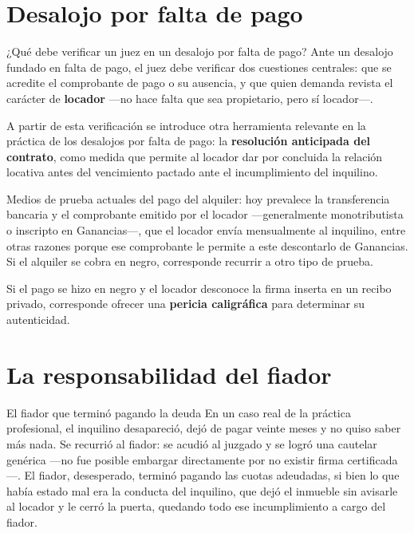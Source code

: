 \documentclass[12pt,oneside]{book}
\begin{document}
\section{Desalojo por falta de pago}

\begin{exercise}{¿Qué debe verificar un juez en un desalojo por falta de pago?}
Ante un desalojo fundado en falta de pago, el juez debe verificar dos cuestiones centrales: que se acredite el comprobante de pago o su ausencia, y que quien demanda revista el carácter de \textbf{locador} —no hace falta que sea propietario, pero sí locador—.

A partir de esta verificación se introduce otra herramienta relevante en la práctica de los desalojos por falta de pago: la \textbf{resolución anticipada del contrato}, como medida que permite al locador dar por concluida la relación locativa antes del vencimiento pactado ante el incumplimiento del inquilino.
\end{exercise}

\begin{important}
Medios de prueba actuales del pago del alquiler: hoy prevalece la transferencia bancaria y el comprobante emitido por el locador —generalmente monotributista o inscripto en Ganancias—, que el locador envía mensualmente al inquilino, entre otras razones porque ese comprobante le permite a este descontarlo de Ganancias. Si el alquiler se cobra en negro, corresponde recurrir a otro tipo de prueba.

Si el pago se hizo en negro y el locador desconoce la firma inserta en un recibo privado, corresponde ofrecer una \textbf{pericia caligráfica} para determinar su autenticidad.
\end{important}

\section{La responsabilidad del fiador}

\begin{example}{El fiador que terminó pagando la deuda}
En un caso real de la práctica profesional, el inquilino desapareció, dejó de pagar veinte meses y no quiso saber más nada. Se recurrió al fiador: se acudió al juzgado y se logró una cautelar genérica —no fue posible embargar directamente por no existir firma certificada—. El fiador, desesperado, terminó pagando las cuotas adeudadas, si bien lo que había estado mal era la conducta del inquilino, que dejó el inmueble sin avisarle al locador y le cerró la puerta, quedando todo ese incumplimiento a cargo del fiador.
\end{example}
\end{document}
